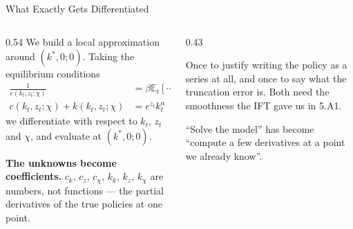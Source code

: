 \begin{frame}{What Exactly Gets Differentiated}
\begin{columns}[T]
\begin{column}{0.54\textwidth}
\small
We build a local approximation around $(k^{*},0;0)$. Taking the equilibrium conditions
\begin{align*}
\frac{1}{c(k_{t},z_{t};\chi)} &=\beta\mathbb{E}_{t}\!\left[\cdots\right]\\
c(k_{t},z_{t};\chi)+k(k_{t},z_{t};\chi) &= e^{z_{t}}k_{t}^{\alpha}
\end{align*}
we differentiate with respect to $k_t$, $z_t$ and $\chi$, and evaluate at $(k^{*},0;0)$.
\medskip

\textbf{The unknowns become coefficients.} $c_k$, $c_z$, $c_\chi$, $k_k$, $k_z$, $k_\chi$ are numbers, not functions --- the partial derivatives of the true policies at one point.
\end{column}
\begin{column}{0.43\textwidth}
\begin{conceptbox}[title=\textbf{Taylor's theorem, twice over}]\small
Once to justify writing the policy as a series at all, and once to say what the truncation error is. Both need the smoothness the IFT gave us in 5.A1.
\end{conceptbox}
\medskip
\begin{takeawaybox}\footnotesize
``Solve the model'' has become ``compute a few derivatives at a point we already know''.
\end{takeawaybox}
\end{column}
\end{columns}
\vspace{1mm}
\end{frame}

